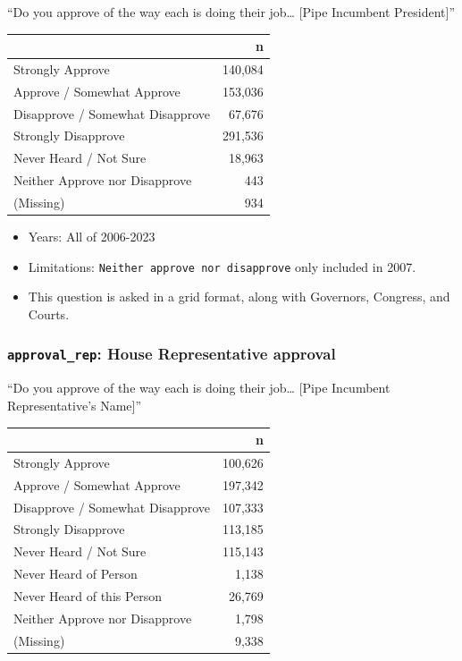 \documentclass[10pt,article,oneside]{memoir}
\theoremstyle{definition}
\begin{document}
``Do you approve of the way each is doing their job\ldots{} {[}Pipe
Incumbent President{]}''

\begin{table}[H]
\centering
\begin{tabular}[t]{lr}
\toprule
 & n\\
\midrule
Strongly Approve & 140,084\\
Approve / Somewhat Approve & 153,036\\
Disapprove / Somewhat Disapprove & 67,676\\
Strongly Disapprove & 291,536\\
Never Heard / Not Sure & 18,963\\
Neither Approve nor Disapprove & 443\\
(Missing) & 934\\
\bottomrule
\end{tabular}
\end{table}

\begin{itemize}
\tightlist
\item
  Years: All of 2006-2023
\item
  Limitations: \texttt{Neither\ approve\ nor\ disapprove} only included
  in 2007.
\item
  This question is asked in a grid format, along with Governors,
  Congress, and Courts.
\end{itemize}

\subsubsection{\texorpdfstring{\texttt{approval\_rep}: House
Representative
approval}{approval\_rep: House Representative approval}}\label{approval_rep-house-representative-approval}

``Do you approve of the way each is doing their job\ldots{} {[}Pipe
Incumbent Representative's Name{]}''

\begin{table}[H]
\centering
\begin{tabular}[t]{lr}
\toprule
 & n\\
\midrule
Strongly Approve & 100,626\\
Approve / Somewhat Approve & 197,342\\
Disapprove / Somewhat Disapprove & 107,333\\
Strongly Disapprove & 113,185\\
Never Heard / Not Sure & 115,143\\
Never Heard of Person & 1,138\\
Never Heard of this Person & 26,769\\
Neither Approve nor Disapprove & 1,798\\
(Missing) & 9,338\\
\bottomrule
\end{tabular}
\end{table}
\end{document}
